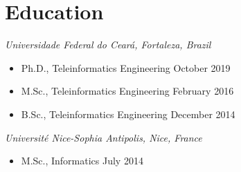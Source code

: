 \section{Education}

{\sl Universidade Federal do Ceará, Fortaleza, Brazil}
\begin{itemize}
	\item[] Ph.D., Teleinformatics Engineering \hfill October 2019
	\item[] M.Sc., Teleinformatics Engineering \hfill February 2016
	\item[] B.Sc., Teleinformatics Engineering \hfill December 2014
\end{itemize}

{\sl Université Nice-Sophia Antipolis, Nice, France}
\begin{itemize}
	\item[] M.Sc., Informatics \hfill July 2014
\end{itemize}